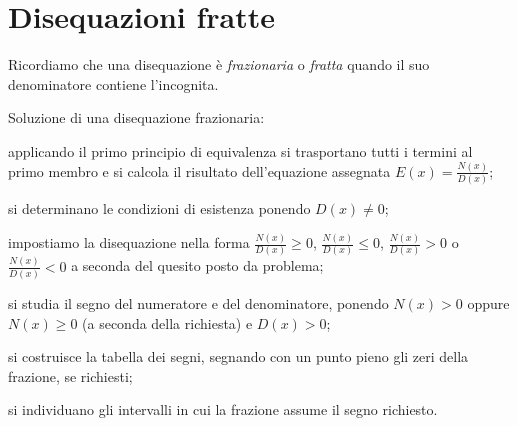 \vspazio\ovalbox{\ref{ese:4.45}, \ref{ese:4.46}, \ref{ese:4.47}, \ref{ese:4.48}, \ref{ese:4.49}, \ref{ese:4.50}, \ref{ese:4.51}, \ref{ese:4.52}, \ref{ese:4.53}, \ref{ese:4.54}, \ref{ese:4.55}, \ref{ese:4.56}, \ref{ese:4.57}}

\section{Disequazioni fratte}

Ricordiamo che una disequazione è \emph{frazionaria} o \emph{fratta} quando il suo denominatore contiene l'incognita.
\begin{procedura}
Soluzione di una disequazione frazionaria:
\begin{enumeratea}
\item applicando il primo principio di equivalenza si trasportano tutti i termini al primo membro e si calcola il risultato dell'equazione assegnata $E(x)=\frac{N(x)}{D(x)}$;
\item si determinano le condizioni di esistenza ponendo $D(x)\neq 0$;
\item impostiamo la disequazione nella forma $\frac{N(x)}{D(x)}\ge 0$, $\frac{N(x)}{D(x)}\le 0$, $\frac{N(x)}{D(x)}>0$ o $\frac{N(x)}{D(x)}<0$ a seconda del quesito posto da problema;
\item si studia il segno del numeratore e del denominatore, ponendo $N(x)>0$ oppure $N(x)\ge 0$ (a seconda della richiesta) e $D(x)>0$;
\item si costruisce la tabella dei segni, segnando con un punto pieno gli zeri della frazione, se richiesti;
\item si individuano gli intervalli in cui la frazione assume il segno richiesto.
\end{enumeratea}
\end{procedura}

